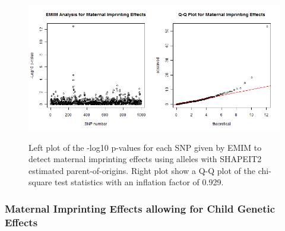 \documentclass[a4paper,12pt]{article}
\begin{document}
{\begin{figure}[ht]
{\begin{center}
{\includegraphics[width=400pt]{pooExampleDataIm.png}}
\caption{Left plot of the -log10 p-values for each SNP given by EMIM to detect maternal imprinting effects using alleles with SHAPEIT2 estimated parent-of-origins. Right plot show a Q-Q plot of the chi-square test statistics with an inflation factor of 0.929.}
\label{poo-im-fig}
\end{center}}
\end{figure}
}
\subsubsection{Maternal Imprinting Effects allowing for Child Genetic Effects}
\label{eg-maternal-imp-wo-child}
\end{document}
